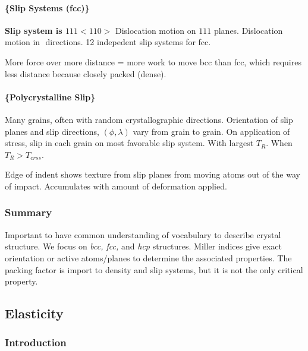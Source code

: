 \documentclass[
]{article}
\begin{document}
\hypertarget{slip-systems-fcc}{%
\paragraph{\{Slip Systems (fcc)\}}\label{slip-systems-fcc}}

{}

\textbf{Slip system is \({111}<110>\)} Dislocation motion on \({111}\)
planes. Dislocation motion in \(<110>\) directions. 12 indepedent slip
systems for fcc.

{More force over more distance = more work to move bcc than fcc, which
requires less distance because closely packed (dense).}

\hypertarget{polycrystalline-slip}{%
\paragraph{\{Polycrystalline Slip\}}\label{polycrystalline-slip}}

Many grains, often with random crystallographic directions. Orientation
of slip planes and slip directions, \((\phi, \lambda)\) vary from grain
to grain. On application of stress, slip in each grain on most favorable
slip system. With largest \(T_{R}\). When \(T_{R} > T_{crss}\).

{}

{Edge of indent shows texture from slip planes from moving atoms out of
the way of impact. Accumulates with amount of deformation applied.}

\hypertarget{summary}{%
\subsubsection{Summary}\label{summary}}

Important to have common understanding of vocabulary to describe crystal
structure. We focus on \emph{bcc, fcc,} and \emph{hcp} structures.
Miller indices give exact orientation or active atoms/planes to
determine the associated properties. The packing factor is import to
density and slip systems, but it is not the only critical property.

\hypertarget{elasticity}{%
\subsection{Elasticity}\label{elasticity}}

\hypertarget{introduction-1}{%
\subsubsection{Introduction}\label{introduction-1}}
\end{document}
